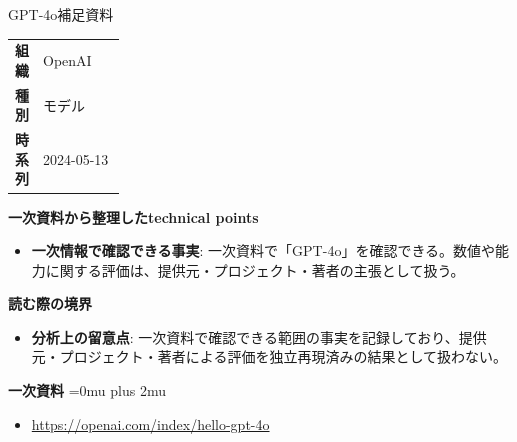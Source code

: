 \begin{technicalnote}{GPT-4o}{補足資料}
\begingroup
\begin{tabularx}{\linewidth}{@{}>{\bfseries}p{0.22\linewidth}X@{}}
組織 & OpenAI \\
種別 & モデル \\
時系列 & 2024-05-13 \\
\end{tabularx}
\smallskip
{\bfseries 一次資料から整理したtechnical points}
\begin{itemize}[leftmargin=1.5em,itemsep=0.35em]
\item \textbf{一次情報で確認できる事実}: 一次資料で「GPT-4o」を確認できる。数値や能力に関する評価は、提供元・プロジェクト・著者の主張として扱う。
\end{itemize}
\begin{minipage}{\linewidth}
{\bfseries 読む際の境界}
\begin{itemize}[leftmargin=1.5em,itemsep=0.35em]
\item \textbf{分析上の留意点}: 一次資料で確認できる範囲の事実を記録しており、提供元・プロジェクト・著者による評価を独立再現済みの結果として扱わない。
\end{itemize}
\begin{samepage}
{\bfseries 一次資料}
\begingroup\sloppy
\Urlmuskip=0mu plus 2mu\relax
\begin{itemize}[leftmargin=1.5em,itemsep=0.25em]
\item {\scriptsize\url{https://openai.com/index/hello-gpt-4o}}
\end{itemize}
\endgroup
\end{samepage}
\end{minipage}
\endgroup
\end{technicalnote}
\medskip
